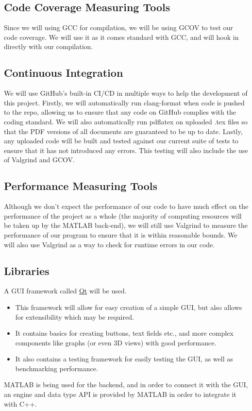 \documentclass{article}
\begin{document}
\subsection{Code Coverage Measuring Tools}
Since we will using GCC for compilation, we will be using GCOV to test our code coverage. We will use it as
it comes standard with GCC, and will hook in directly with our compilation.

\subsection{Continuous Integration}
We will use GitHub's built-in CI/CD in multiple ways to help the development of this project. Firstly, we will automatically run clang-format when code is pushed to the repo, allowing us to ensure that any code on GitHub complies with the coding standard.
We will also automatically run pdflatex on uploaded .tex files so that the PDF versions of all documents are guaranteed to be up to date. Lastly, any uploaded code will be built and tested against our current suite of tests to ensure that it has not introduced any errors.
This testing will also include the use of Valgrind and GCOV.

\subsection{Performance Measuring Tools}
Although we don't expect the performance of our code to have much effect on the performance of the project as a whole (the majority of computing resources will be taken up by the MATLAB back-end), we will still use Valgrind to measure the performance of our program to ensure that
it is within reasonable bounds. We will also use Valgrind as a way to check for runtime errors in our code.

\subsection{Libraries}
A GUI framework called \href{https://www.qt.io/}{Qt} will be used.
\begin{itemize}
	\item This framework will allow for easy creation of a simple GUI, but also allows for extensibility which may be required.
	\item It contains basics for creating buttons, text fields etc., and more complex components like graphs (or even 3D views) with good performance.
	\item It also contains a testing framework for easily testing the GUI, as well as benchmarking performance.
\end{itemize}
MATLAB is being used for the backend, and in order to connect it with the GUI, an engine and data type API is 
provided by MATLAB in order to integrate it with C++.
\end{document}
